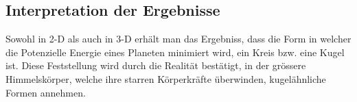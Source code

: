\subsection{Interpretation der Ergebnisse}
Sowohl in 2-D als auch in 3-D erhält man das Ergebniss, dass die Form in welcher die Potenzielle Energie eines Planeten minimiert wird, ein Kreis bzw. eine Kugel ist.
Diese Feststellung wird durch die Realität bestätigt, in der grössere Himmelskörper, welche ihre starren Körperkräfte überwinden, kugelähnliche Formen annehmen.

